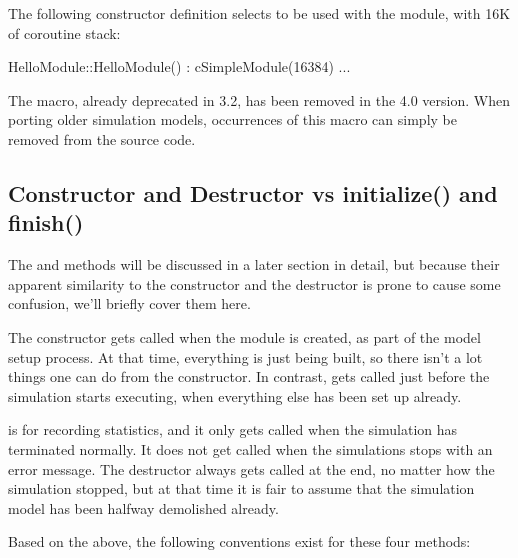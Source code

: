 The following constructor definition selects  to be used
with the module, with 16K of coroutine stack:

\begin{cpp}
HelloModule::HelloModule() : cSimpleModule(16384) {...}
\end{cpp}

\begin{note}
    The  macro, already deprecated in {\opp} 3.2,
    has been removed in the 4.0 version. When porting older simulation models,
    occurrences of this macro can simply be removed from the source code.
\end{note}



\subsection{Constructor and Destructor vs initialize() and finish()}
\label{sec:simple-modules:ctor-dtor-init-finish}

The  and  methods will be discussed
in a later section in detail, but because their apparent similarity
to the constructor and the destructor is prone to cause some confusion,
we'll briefly cover them here.

The constructor gets called when the module is created, as part of the
model setup process. At that time, everything is just being built,
so there isn't a lot things one can do from the constructor.
In contrast,  gets called just before the
simulation starts executing, when everything else has been set up
already.

 is for recording statistics, and it only gets called
when the simulation has terminated normally. It does not get called when
the simulations stops with an error message. The destructor always
gets called at the end, no matter how the simulation stopped, but
at that time it is fair to assume that the simulation model has been
halfway demolished already.

Based on the above, the following conventions exist for these four methods:

